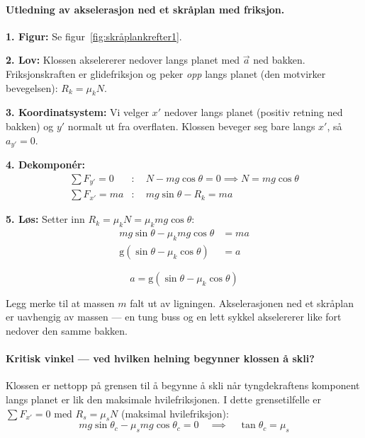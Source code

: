 \paragraph*{Utledning av akselerasjon ned et skråplan med friksjon.}

\noindent
\textbf{1. Figur:} Se figur~\ref{fig:skråplankrefter1}.

\smallskip\noindent
\textbf{2. Lov:} Klossen akselererer nedover langs planet med $\vec{a}$ ned bakken. Friksjonskraften er glidefriksjon og peker \textit{opp} langs planet (den motvirker bevegelsen): $R_k = \mu_k N$.

\smallskip\noindent
\textbf{3. Koordinatsystem:} Vi velger $x'$ nedover langs planet (positiv retning ned bakken) og $y'$ normalt ut fra overflaten. Klossen beveger seg bare langs $x'$, så $a_{y'} = 0$.

\smallskip\noindent
\textbf{4. Dekomponér:}
\begin{align*}
    \sum F_{y'} = 0 &:\quad N - mg\cos\theta = 0 \implies N = mg\cos\theta\\
    \sum F_{x'} = ma &:\quad mg\sin\theta - R_k = ma
\end{align*}

\smallskip\noindent
\textbf{5. Løs:} Setter inn $R_k = \mu_k N = \mu_k mg\cos\theta$:
\begin{align*}
    mg\sin\theta - \mu_k mg\cos\theta &= ma\\
    \mathrm{g}(\sin\theta - \mu_k\cos\theta) &= a
\end{align*}

\begin{tcolorbox}[colback=gray!13, colframe=gray!40, boxrule=0.5pt, top=5pt, bottom=5pt, left=8pt, right=8pt]
\[
    a = \mathrm{g}(\sin\theta - \mu_k\cos\theta)
\]
\end{tcolorbox}

\noindent
Legg merke til at massen $m$ falt ut av ligningen. Akselerasjonen ned et skråplan er uavhengig av massen — en tung buss og en lett sykkel akselererer like fort nedover den samme bakken.

\medskip

\paragraph*{Kritisk vinkel — ved hvilken helning begynner klossen å skli?}

Klossen er nettopp på grensen til å begynne å skli når tyngdekraftens komponent langs planet er lik den maksimale hvilefriksjonen. I dette grensetilfelle er $\sum F_{x'} = 0$ med $R_s = \mu_s N$ (maksimal hvilefriksjon):
\[
mg\sin\theta_c - \mu_s mg\cos\theta_c = 0
\quad\implies\quad
\tan\theta_c = \mu_s
\]

